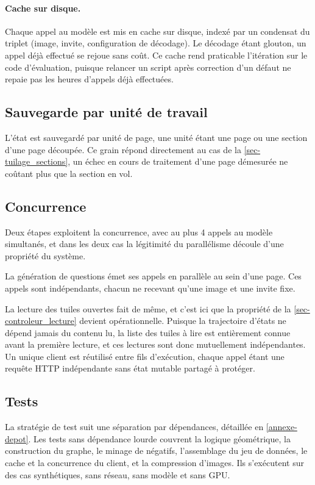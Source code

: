 \paragraph{Cache sur disque.} Chaque appel au modèle est mis en cache sur disque,
indexé par un condensat du triplet (image, invite, configuration de décodage). Le
décodage étant glouton, un appel déjà effectué se rejoue sans coût. Ce cache rend
praticable l'itération sur le code d'évaluation, puisque relancer un script après
correction d'un défaut ne repaie pas les heures d'appels déjà effectuées.
 
\subsection{Sauvegarde par unité de travail}
 
L'état est sauvegardé par unité de page, une unité étant une page ou une section
d'une page découpée. Ce grain répond directement au cas de la
\cref{sec-tuilage_sections}, un échec en cours de traitement d'une page démesurée
ne coûtant plus que la section en vol.
 
\subsection{Concurrence}
\label{sec-impl_concurrence}
 
Deux étapes exploitent la concurrence, avec au plus \num{4} appels au modèle
simultanés, et dans les deux cas la légitimité du parallélisme découle d'une
propriété du système.
 
La génération de questions émet ses appels en parallèle au sein d'une page. Ces
appels sont indépendants, chacun ne recevant qu'une image et une invite fixe.
 
La lecture des tuiles ouvertes fait de même, et c'est ici que la propriété de la
\cref{sec-controleur_lecture} devient opérationnelle. Puisque la trajectoire
d'états ne dépend jamais du contenu lu, la liste des tuiles à lire est entièrement
connue avant la première lecture, et ces lectures sont donc mutuellement
indépendantes. Un unique client est réutilisé entre fils d'exécution, chaque appel
étant une requête HTTP indépendante sans état mutable partagé à protéger.
 
\subsection{Tests}
 
La stratégie de test suit une séparation par dépendances, détaillée en
\cref{annexe-depot}. Les tests sans dépendance lourde couvrent la logique
géométrique, la construction du graphe, le minage de négatifs, l'assemblage du jeu
de données, le cache et la concurrence du client, et la compression d'images. Ils
s'exécutent sur des cas synthétiques, sans réseau, sans modèle et sans GPU.
 
